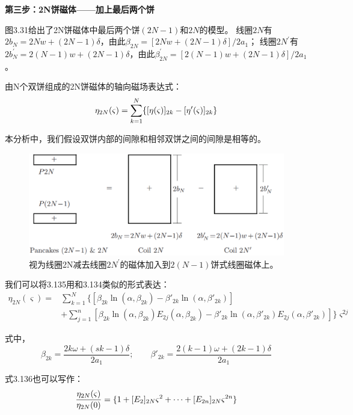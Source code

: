 \textbf{第三步：2N饼磁体——加上最后两个饼}

图3.31给出了2N饼磁体中最后两个饼$(2N−1)$和$2N$的模型。
线圈$2N$有$2b_N =2Nw+(2N−1)\delta$，由此$\beta_{2N}=[2Nw+(2N−1)\delta]/2a_1$；
线圈$2N^\prime$有$2b_N^\prime=2(N-1)w+(2N−1)\delta$，由此$\beta_{2N}^\prime=[2(N-1)w+(2N−1)\delta]/2a_1$。

由N个双饼组成的2N饼磁体的轴向磁场表达式：
\begin{equation}
\eta_{2N}(\varsigma)=\sum_{k=1}^{N}\{[\eta(\varsigma)]_{2k}-[\eta'(\varsigma)]_{2k}\}\\%
\end{equation}

本分析中，我们假设双饼内部的间隙和相邻双饼之间的间隙是相等的。
\begin{figure}[htbp]
	\centering
	\includegraphics[scale=0.4]{chpt3/figs/fig3.31.eps}
	\caption{视为线圈2N减去线圈$2N^\prime$的磁体加入到$2(N-1)$饼式线圈磁体上。}
\end{figure}

我们可以将3.135用和3.134类似的形式表达：
\begin{equation}
\begin{split}
\eta_{2N}(\varsigma)=&\sum_{k=1}^{N}\{\left[\beta_{2k}\ln(\alpha,\beta_{2k})-\beta'_{2k}\ln(\alpha,\beta'_{2k})\right]\\
&+\sum_{j=1}^{n}[\beta_{2k}\ln(\alpha,\beta_{2k})E_{2j}(\alpha,\beta_{2k})-\beta'_{2k}\ln(\alpha,\beta'_{2k})E_{2j}(\alpha,\beta'_{2k})]\}\varsigma^{2j}%
\end{split}
\end{equation}

式中，
\begin{equation*}
\beta_{2k}=\frac{2k\omega+(sk-1)\delta}{2a_1};\qquad \beta'_{2k}=\frac{2(k-1)\omega+(2k-1)\delta}{2a_{1}}
\end{equation*}

式3.136也可以写作：
\begin{equation}
\frac{\eta_{2N}(\varsigma)}{\eta_{2N}(0)}=\{1+[E_{2}]_{2N}\varsigma^2+\cdots+[E_{2n}]_{2N}\varsigma^{2n}\}\\%
\end{equation}

